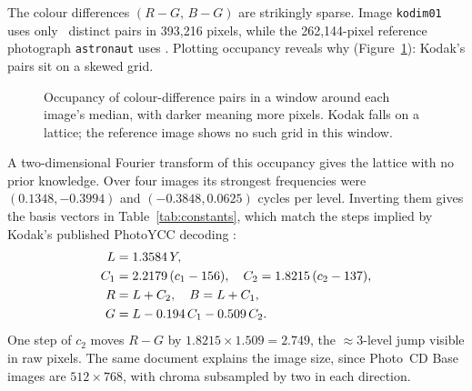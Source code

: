 \documentclass[10pt,twocolumn]{article}
\begin{document}
The colour differences $(R-G,\,B-G)$ are strikingly sparse. Image \texttt{kodim01} uses only \latKpairs\ distinct pairs in 393,216 pixels, while the 262,144-pixel reference photograph \texttt{astronaut} uses \latOpairs. Plotting occupancy reveals why (Figure~\ref{fig:lattice}): Kodak's pairs sit on a skewed grid.

\begin{figure}[t]
\centering
{}
\caption{Occupancy of colour-difference pairs in a window around each image's median, with darker meaning more pixels. Kodak falls on a lattice; the reference image shows no such grid in this window.}
\label{fig:lattice}
\end{figure}

A two-dimensional Fourier transform of this occupancy gives the lattice with no prior knowledge. Over four images its strongest frequencies were $(0.1348,-0.3994)$ and $(-0.3848,0.0625)$ cycles per level. Inverting them gives the basis vectors in Table~\ref{tab:constants}, which match the steps implied by Kodak's published PhotoYCC decoding \cite{pcd045}:
\begin{align}
L &= 1.3584\,Y, \notag\\
C_1 &= 2.2179\,(c_1-156), \quad C_2 = 1.8215\,(c_2-137), \notag\\
R &= L + C_2,\quad B = L + C_1, \notag\\
G &= L - 0.194\,C_1 - 0.509\,C_2. \label{eq:pcd}
\end{align}
One step of $c_2$ moves $R-G$ by $1.8215\times1.509=2.749$, the $\approx$3-level jump visible in raw pixels. The same document explains the image size, since Photo~CD Base images are $512\times768$, with chroma subsampled by two in each direction.
\end{document}
